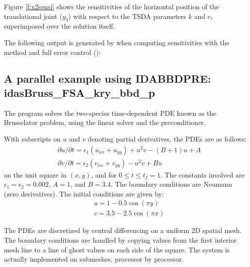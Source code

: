 Figure \ref{f:x2sensi} shows the sensitivities of the horizontal position of the translational joint 
($y_3$) with respect to the TSDA parameters $k$ and $c$, superimposed over the solution itself.
 

The following output is generated by  when computing
sensitivities with the  method and full error
control ():




\subsection{A parallel example using IDABBDPRE: idasBruss\_FSA\_kry\_bbd\_p}
\label{ss:idasBruss_FSA_kry_bbd_p}

The  program solves the two-species time-dependent
PDE known as the Brusselator problem, using the {\idaspgmr} linear solver and the
{\idabbdpre} preconditioner.

With subscripts on $u$ and $v$ denoting partial derivatives, the PDEs
are as follows:
\begin{equation*}
\begin{split}
  &\partial u / \partial t = \epsilon_1 (u_{xx} + u_{yy})
                              + u^2 v - (B + 1) u + A \\
  &\partial v / \partial t = \epsilon_2 (v_{xx} + v_{yy})
                              - u^2 v + B  u
\end{split}
\end{equation*}
on the unit square in $(x,y)$, and for $0 \leq t \leq t_f = 1$.
The constants involved are $\epsilon_1 = \epsilon_2 = 0.002$, $A = 1$,
and $B = 3.4$.  The boundary conditions are Neumann (zero derivatives).
The initial conditions are given by:
\begin{equation*}
\begin{split}
  &u = 1 - 0.5 \cos(\pi y) \\
  &v = 3.5 - 2.5 \cos(\pi x)
\end{split}
\end{equation*}

The PDEs are discretized by central differencing on a uniform 2D spatial mesh.
The boundary conditions are handled by copying values from the first interior
mesh line to a line of ghost values on each side of the square.
The system is actually implemented on submeshes, processor by processor.

